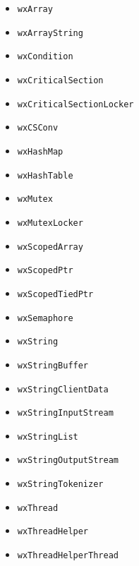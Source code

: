 \documentclass[a4paper,11pt,oneside,titlepage]{report}
\begin{document}
\begin{itemize}
\item \texttt{wxArray}
\item \texttt{wxArrayString}
\item \texttt{wxCondition}
\item \texttt{wxCriticalSection}
\item \texttt{wxCriticalSectionLocker}
\item \texttt{wxCSConv}
\item \texttt{wxHashMap}
\item \texttt{wxHashTable}
\item \texttt{wxMutex}
\item \texttt{wxMutexLocker}
\item \texttt{wxScopedArray}
\item \texttt{wxScopedPtr}
\item \texttt{wxScopedTiedPtr}
\item \texttt{wxSemaphore}
\item \texttt{wxString}
\item \texttt{wxStringBuffer}
\item \texttt{wxStringClientData}
\item \texttt{wxStringInputStream}
\item \texttt{wxStringList}
\item \texttt{wxStringOutputStream}
\item \texttt{wxStringTokenizer}
\item \texttt{wxThread}
\item \texttt{wxThreadHelper}
\item \texttt{wxThreadHelperThread}
\end{itemize}
\end{document}
